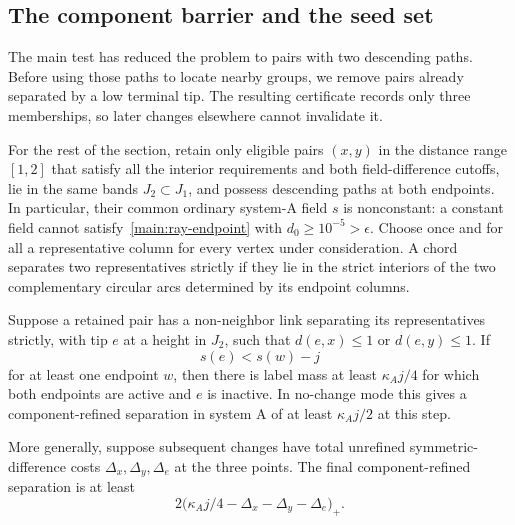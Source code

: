 \subsection{The component barrier and the seed set}
\label{pack:seed-definition-section}

The main test has reduced the problem to pairs with two descending paths.
Before using those paths to locate nearby groups, we remove pairs already
separated by a low terminal tip. The resulting certificate records only
three memberships, so later changes elsewhere cannot invalidate it.

For the rest of the section, retain only eligible pairs $(x,y)$ in
the distance range $[1,2]$ that satisfy all the interior requirements
and both field-difference cutoffs, lie in the same bands $J_2\subset
J_1$, and possess descending paths at both endpoints.  In particular,
their common ordinary system-A field $s$ is nonconstant: a constant
field cannot satisfy~\eqref{main:ray-endpoint} with
$d_0\ge10^{-5}>\epsilon$.
Choose once and for all a representative column for every vertex
under consideration.  A chord separates two representatives
strictly if they lie in the strict interiors of the two complementary
circular arcs determined by its endpoint columns.

\begin{lemma}
\label{pack:barrier}
Suppose a retained pair has a non-neighbor link separating its
representatives strictly, with tip $e$ at a height in $J_2$, such
that $d(e,x)\le1$ or $d(e,y)\le1$.  If
\begin{equation}
 s(e)<s(w)-j
 \label{pack:drop}
\end{equation}
for at least one endpoint $w$, then there is label mass at least
$\kappa_Aj/4$ for which both endpoints are active and $e$ is
inactive.  In no-change mode this gives a component-refined
separation in system A of at least $\kappa_Aj/2$ at this step.

More generally, suppose subsequent changes have total unrefined
symmetric-difference costs $\Delta_x,\Delta_y,\Delta_e$ at the
three points.  The final component-refined separation is at least
\begin{equation}
 2\bigl(\kappa_Aj/4-\Delta_x-\Delta_y-\Delta_e\bigr)_+.
 \label{pack:barrier-damage}
\end{equation}
\end{lemma}

